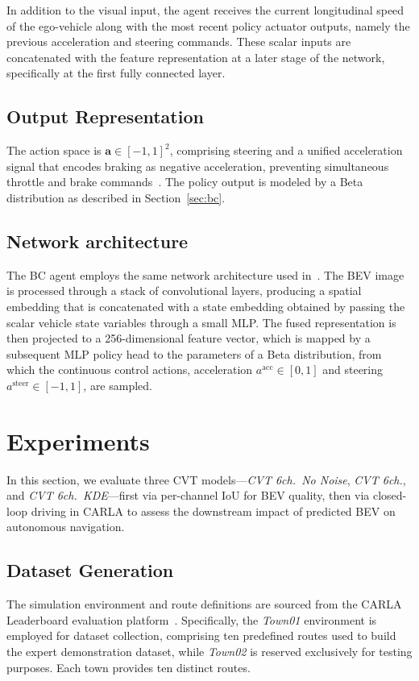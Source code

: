 \documentclass[12pt]{article}
\begin{document}
In addition to the visual input, the agent receives the current longitudinal speed of the ego-vehicle along with the most recent policy actuator outputs, namely the previous acceleration and steering commands. These scalar inputs are concatenated with the feature representation at a later stage of the network, specifically at the first fully connected layer.

\subsection{Output Representation}

The action space is $\mathbf{a} \in [-1, 1]^{2}$, comprising steering and a unified acceleration signal that encodes braking as negative acceleration, preventing simultaneous throttle and brake commands~\cite{Petrazzini2021}. The policy output is modeled by a Beta distribution as described in Section~\ref{sec:bc}.

\subsection{Network architecture}

The BC agent employs the same network architecture used in~\cite{antonelo2024investigating}.
%
The BEV image is processed through a stack of convolutional layers, producing a spatial embedding that is concatenated with a state embedding obtained by passing the scalar vehicle state variables through a small MLP.
The fused representation is then projected to a 256-dimensional feature vector, which is mapped by a subsequent MLP policy head to the parameters of a Beta distribution, from which the continuous control actions, acceleration \(a^{\mathrm{acc}} \in [0, 1]\) and steering \(a^{\mathrm{steer}} \in [-1, 1]\), are sampled.


\section{Experiments}
\label{sec:experiments}

In this section, we evaluate three CVT models—\textit{CVT 6ch.\ No Noise}, \textit{CVT 6ch.}, and \textit{CVT 6ch.\ KDE}—first via per-channel IoU for BEV quality, then via closed-loop driving in CARLA to assess the downstream impact of predicted BEV on autonomous navigation.



\subsection{Dataset Generation}
\label{sec:dataset}
The simulation
environment and route definitions are sourced from the CARLA Leaderboard evaluation
platform~\cite{leaderboard_2020}. Specifically, the \textit{Town01} environment is
employed for dataset collection, comprising ten predefined routes used to build the
expert demonstration dataset, while \textit{Town02} is reserved exclusively for
testing purposes. Each town provides ten distinct routes.
\end{document}
